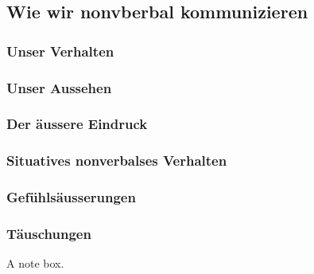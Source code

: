 \documentclass[
    invert-title=false,
    titlepage=true,
    titleimage-ratio=1011,
    parskip=half-,
]{bfhpub}                %
\begin{document}
    \subsection{Wie wir nonvberbal kommunizieren}

    \subsubsection{Unser Verhalten}

    \subsubsection{Unser Aussehen}

    \subsubsection{Der äussere Eindruck}

    \subsubsection{Situatives nonverbalses Verhalten}

    \subsubsection{Gefühlsäusserungen}

    \subsubsection{Täuschungen}


    \begin{bfhNoteBox}
        A note box.
    \end{bfhNoteBox}

    \printbibliography
\end{document}
